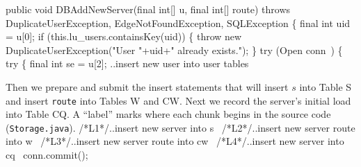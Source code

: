 \documentclass{article}
\def\nwendcode{\endtrivlist \endgroup}      %
\let\nwdocspar=\par
\theoremstyle{definition}                   %
\begin{document}
\nwenddocs{}\endmoddef{}
public void DBAddNewServer(final int[] u, final int[] route)
throws DuplicateUserException, EdgeNotFoundException, SQLException \{
  final int uid = u[0];
  if (this.lu_users.containsKey(uid)) \{
    throw new DuplicateUserException("User "+uid+" already exists.");
  \}
  try (\LA{}Open \code{}conn\edoc{}~{\nwtagstyle{}}\RA{}) \{
    try \{
      final int se = u[2];
\eatline
{}\nwendcode{}
\nwenddocs{}\plusendmoddef
      \LA{}..insert new user into user tables~{\nwtagstyle{}}\RA{}
\nwendcode{}\nwdocspar
{\small Then we prepare and submit the insert statements that will insert $s$
into Table S and insert {\tt{}route} into Tables W and CW. Next we record the
server's initial load into Table CQ. A ``label'' marks where each chunk begins
in the source code ({\tt{}Storage.java}).}
\nwenddocs{}\plusendmoddef
/*L1*/\LA{}..insert new server into s~{\nwtagstyle{}}\RA{}
/*L2*/\LA{}..insert new server route into w~{\nwtagstyle{}}\RA{}
/*L3*/\LA{}..insert new server route into cw~{\nwtagstyle{}}\RA{}
/*L4*/\LA{}..insert new server into cq~{\nwtagstyle{}}\RA{}
      conn.commit();
\end{document}
